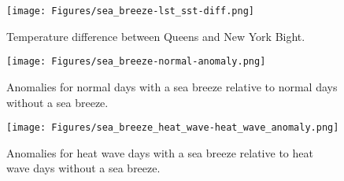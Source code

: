 \begin{figure}[ht]
	\centering
	\texttt{[image: Figures/sea\_breeze-lst\_sst-diff.png]}
	\caption{Temperature difference between Queens and New York Bight.}
	\label{fig:sea_breeze-lst_sst-diff}
\end{figure}

\begin{figure}[ht]
	\centering
	\texttt{[image: Figures/sea\_breeze-normal-anomaly.png]}
	\caption{Anomalies for normal days with a sea breeze relative to normal days without a sea breeze.}
	\label{fig:sea_breeze_normal-normal-anomaly}
\end{figure}

\begin{figure}[ht]
	\centering
	\texttt{[image: Figures/sea\_breeze\_heat\_wave-heat\_wave\_anomaly.png]}
	\caption{Anomalies for heat wave days with a sea breeze relative to heat wave days without a sea breeze.}
	\label{fig:sea_breeze_heat_wave_anomaly}
\end{figure}

\FloatBarrier

